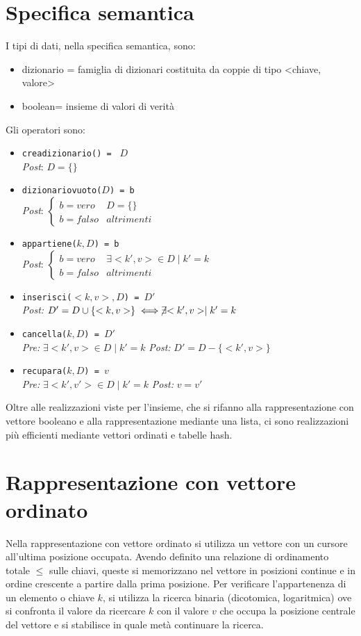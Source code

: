 \documentclass[12pt]{report}
\begin{document}
	\section{Specifica semantica}
	I tipi di dati, nella specifica semantica, sono:
	\begin{itemize}
		\item dizionario = famiglia di dizionari costituita da coppie di tipo <chiave, valore>
		\item boolean= insieme di valori di verità
	\end{itemize}
	Gli operatori sono:
	\begin{itemize}
		\item \texttt{creadizionario() = } $D$ \\
		\quad \textit{Post}: $D = \{\}$
		\item \texttt{dizionariovuoto($D$) = b} \\
		\quad \textit{Post}: $\begin{cases}
			b = vero & D = \{\} \\
			b = falso & altrimenti
		\end{cases}$
		\item \texttt{appartiene($k, D$) = b} \\
		\quad \textit{Post}: $\begin{cases}
			b = vero & \exists <k', v> \in D \mid k'=k \\
			b = falso & altrimenti
		\end{cases}$
		\item \texttt{inserisci($<k, v>, D$) = $D'$} \\
		\quad \textit{Post:} $D'= D \cup \{<k, v>\} \iff \centernot{\exists} <k', v> \mid k'=k$
		\item \texttt{cancella($k, D$) = $D'$} \\
		\quad \textit{Pre:} $\exists <k', v> \in D \mid k'= k$
		\quad \textit{Post:} $D' = D - \{<k', v>\}$
		\item \texttt{recupara($k, D$) = $v$} \\
		\quad \textit{Pre:} $\exists <k', v'> \in D \mid k'=k$
		\quad \textit{Post:} $v = v'$
	\end{itemize}
	Oltre alle realizzazioni viste per l'insieme, che si rifanno alla rappresentazione con vettore booleano e alla rappresentazione mediante una lista, ci sono realizzazioni più efficienti mediante vettori ordinati e tabelle hash.
	\section{Rappresentazione con vettore ordinato}
	Nella rappresentazione con vettore ordinato si utilizza un vettore con un cursore all'ultima posizione occupata. Avendo definito una relazione di ordinamento totale $\leq$ sulle chiavi, queste si memorizzano nel vettore in posizioni continue e in ordine crescente a partire dalla prima posizione. Per verificare l'appartenenza di un elemento o chiave $k$, si utilizza la ricerca binaria (dicotomica, logaritmica) ove si confronta il valore da ricercare $k$ con il valore $v$ che occupa la posizione centrale del vettore e si stabilisce in quale metà continuare la ricerca.
\end{document}
